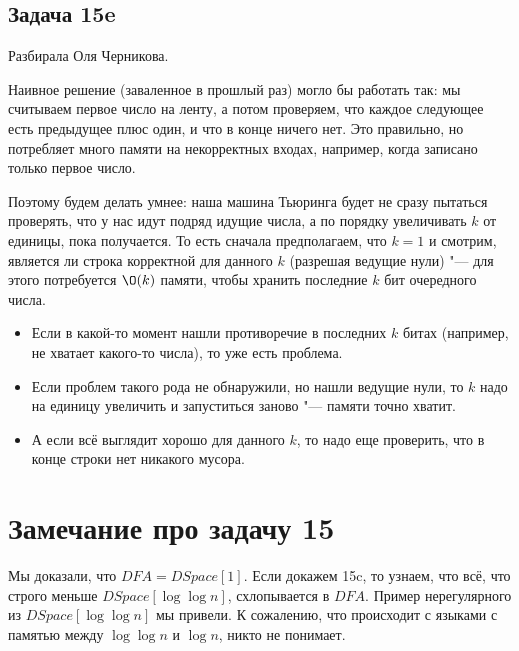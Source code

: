 \subsection{Задача 15e}
	Разбирала Оля Черникова.

	Наивное решение (заваленное в прошлый раз) могло бы работать так: мы считываем первое число на ленту,
	а потом проверяем, что каждое следующее есть предыдущее плюс один, и что в конце ничего нет.
	Это правильно, но потребляет много памяти на некорректных входах, например, когда записано только первое число.

	Поэтому будем делать умнее: наша машина Тьюринга будет не сразу пытаться проверять, что у нас идут подряд идущие числа,
	а по порядку увеличивать $k$ от единицы, пока получается.
	То есть сначала предполагаем, что $k=1$ и смотрим, является ли строка корректной для данного $k$
	(разрешая ведущие нули) "--- для этого потребуется $\O(k)$ памяти, чтобы хранить последние $k$ бит очередного числа.
	\begin{itemize}
		\item Если в какой-то момент нашли противоречие в последних $k$ битах (например, не хватает какого-то числа), то уже есть проблема.
		\item Если проблем такого рода не обнаружили, но нашли ведущие нули, то $k$ надо на единицу увеличить и запуститься заново "--- памяти точно хватит.
		\item А если всё выглядит хорошо для данного $k$, то надо еще проверить, что в конце строки нет никакого мусора.
	\end{itemize}

\section{Замечание про задачу 15}
	Мы доказали, что $DFA=DSpace[1]$.
	Если докажем 15c, то узнаем, что всё, что строго меньше $DSpace[\log \log n]$,
	схлопывается в $DFA$.
	Пример нерегулярного из $DSpace[\log \log n]$ мы привели.
	К сожалению, что происходит с языками с памятью между $\log \log n$ и $\log n$, никто не понимает.
